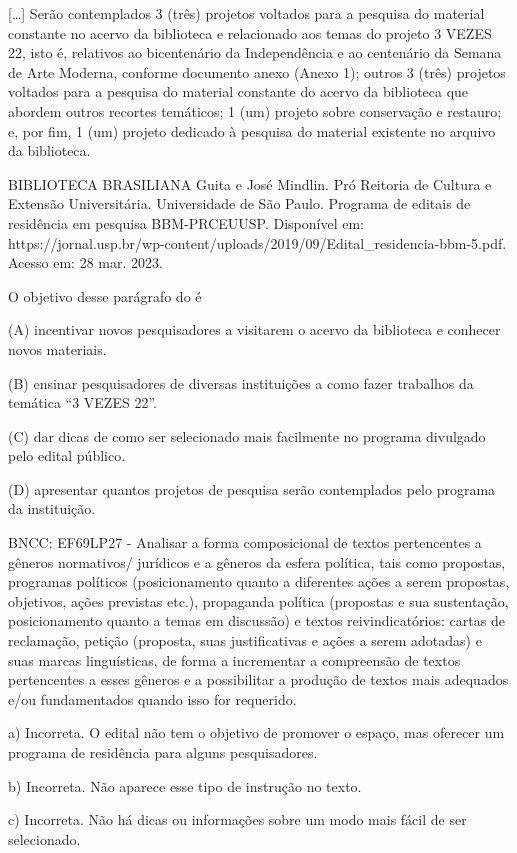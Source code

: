 \begin{itemize}
{[}\ldots{}{]} Serão contemplados 3 (três) projetos voltados para a
pesquisa do material constante no acervo da biblioteca e relacionado aos
temas do projeto 3 VEZES 22, isto é, relativos ao bicentenário da
Independência e ao centenário da Semana de Arte Moderna, conforme
documento anexo (Anexo 1); outros 3 (três) projetos voltados para a
pesquisa do material constante do acervo da biblioteca que abordem
outros recortes temáticos; 1 (um) projeto sobre conservação e restauro;
e, por fim, 1 (um) projeto dedicado à pesquisa do material existente no
arquivo da biblioteca.

BIBLIOTECA BRASILIANA Guita e José Mindlin. Pró Reitoria de Cultura e
Extensão Universitária. Universidade de São Paulo. Programa de editais
de residência em pesquisa BBM-PRCEUUSP. Disponível em:
https://jornal.usp.br/wp-content/uploads/2019/09/Edital\_residencia-bbm-5.pdf.
Acesso em: 28 mar. 2023.

O objetivo desse parágrafo do é

(A) incentivar novos pesquisadores a visitarem o acervo da biblioteca e
conhecer novos materiais.

(B) ensinar pesquisadores de diversas instituições a como fazer
trabalhos da temática ``3 VEZES 22''.

(C) dar dicas de como ser selecionado mais facilmente no programa
divulgado pelo edital público.

(D) apresentar quantos projetos de pesquisa serão contemplados pelo
programa da instituição.

BNCC: EF69LP27 - Analisar a forma composicional de textos pertencentes a
gêneros normativos/ jurídicos e a gêneros da esfera política, tais como
propostas, programas políticos (posicionamento quanto a diferentes ações
a serem propostas, objetivos, ações previstas etc.), propaganda política
(propostas e sua sustentação, posicionamento quanto a temas em
discussão) e textos reivindicatórios: cartas de reclamação, petição
(proposta, suas justificativas e ações a serem adotadas) e suas marcas
linguísticas, de forma a incrementar a compreensão de textos
pertencentes a esses gêneros e a possibilitar a produção de textos mais
adequados e/ou fundamentados quando isso for requerido.

a) Incorreta. O edital não tem o objetivo de promover o espaço, mas
oferecer um programa de residência para alguns pesquisadores.

b) Incorreta. Não aparece esse tipo de instrução no texto.

c) Incorreta. Não há dicas ou informações sobre um modo mais fácil de
ser selecionado.


\end{itemize}
